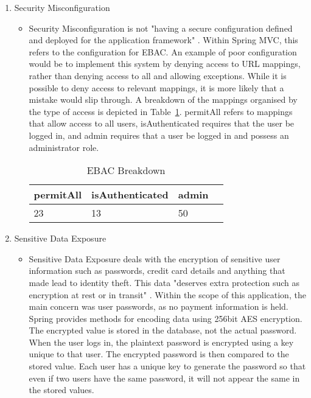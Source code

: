 \begin{enumerate}
\item Security Misconfiguration
\begin{itemize}
\item Security Misconfiguration is not "having a secure configuration defined and deployed for the application framework" \parencite{owasp2013}. Within Spring MVC, this refers to the configuration for EBAC. An example of poor configuration would be to implement this system by denying access to URL mappings, rather than denying access to all and allowing exceptions. While it is possible to deny access to relevant mappings, it is more likely that a mistake would slip through. A breakdown of the mappings organised by the type of access is depicted in Table~\ref{fig:accesstable}. permitAll refers to mappings that allow access to all users, isAuthenticated requires that the user be logged in, and admin requires that a user be logged in and possess an administrator role.

\begin{table}[H]
\caption{EBAC Breakdown}
\begin{center}
    \begin{tabular}{ | l | l | l | p{5cm} |}
    \hline
	\textbf{permitAll} & \textbf{isAuthenticated}& \textbf{admin}\\ \hline
	23 & 13 & 50\\ \hline
    \end{tabular}
\end{center}
\label{fig:accesstable}
\end{table} 
\end{itemize}

\item Sensitive Data Exposure
\begin{itemize}
\item Sensitive Data Exposure deals with the encryption of sensitive user information such as passwords, credit card details and anything that made lead to identity theft. This data "deserves extra protection such as 
encryption at rest or in transit" \parencite{owasp2013}. Within the scope of this application, the main concern was user passwords, as no payment information is held. Spring provides methods for encoding data using 256bit AES encryption. The encrypted value is stored in the database, not the actual password. When the user logs in, the plaintext password is encrypted  using a key unique to that user. The encrypted password is then compared to the stored value. Each user has a unique key to generate the password so that even if two users have the same password, it will not appear the same in the stored values. 
\end{itemize}


\end{enumerate}
